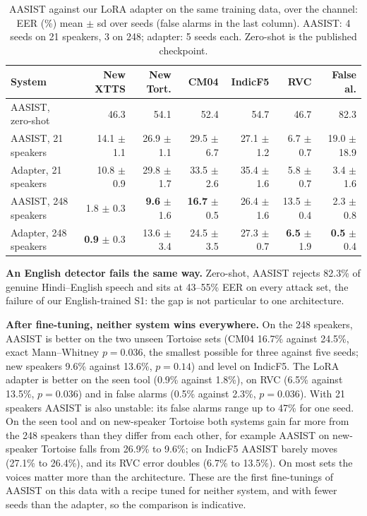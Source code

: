 \begin{table}[t]
\centering
\caption{AASIST against our LoRA adapter on the same training data, over the channel:
EER (\%) mean $\pm$ sd over seeds (false alarms in the last column). AASIST: 4 seeds on 21
speakers, 3 on 248; adapter: 5 seeds each. Zero-shot is the published checkpoint.}
\label{tab:aasist}
\footnotesize
\setlength{\tabcolsep}{3pt}
\begin{tabular}{@{}lrrrrrr@{}}
\toprule
System & New XTTS & New Tort. & CM04 & IndicF5 & RVC & False al. \\
\midrule
AASIST, zero-shot     & 46.3 & 54.1 & 52.4 & 54.7 & 46.7 & 82.3 \\
\midrule
AASIST, 21 speakers   & 14.1 $\pm$ 1.1 & 26.9 $\pm$ 1.1 & 29.5 $\pm$ 6.7 & 27.1 $\pm$ 1.2 & 6.7 $\pm$ 0.7 & 19.0 $\pm$ 18.9 \\
Adapter, 21 speakers  & 10.8 $\pm$ 0.9 & 29.8 $\pm$ 1.7 & 33.5 $\pm$ 2.6 & 35.4 $\pm$ 1.6 & 5.8 $\pm$ 0.7 & 3.4 $\pm$ 1.6 \\
\midrule
AASIST, 248 speakers  & 1.8 $\pm$ 0.3 & \textbf{9.6} $\pm$ 1.6 & \textbf{16.7} $\pm$ 0.5 & 26.4 $\pm$ 1.6 & 13.5 $\pm$ 0.4 & 2.3 $\pm$ 0.8 \\
Adapter, 248 speakers & \textbf{0.9} $\pm$ 0.3 & 13.6 $\pm$ 3.4 & 24.5 $\pm$ 3.5 & 27.3 $\pm$ 0.7 & \textbf{6.5} $\pm$ 1.9 & \textbf{0.5} $\pm$ 0.4 \\
\bottomrule
\end{tabular}
\end{table}

\textbf{An English detector fails the same way.} Zero-shot, AASIST rejects 82.3\% of
genuine Hindi--English speech and sits at 43--55\% EER on every attack set, the failure
of our English-trained S1: the gap is not particular to one architecture.

\textbf{After fine-tuning, neither system wins everywhere.} On the 248 speakers, AASIST
is better on the two unseen Tortoise sets (CM04 16.7\% against 24.5\%, exact
Mann--Whitney $p = 0.036$, the smallest possible for three against five seeds; new
speakers 9.6\% against 13.6\%, $p = 0.14$) and level on IndicF5. The LoRA adapter is better on the
seen tool (0.9\% against 1.8\%), on RVC (6.5\% against 13.5\%, $p = 0.036$) and in false
alarms (0.5\% against 2.3\%, $p = 0.036$). With 21 speakers AASIST is also unstable: its
false alarms range up to 47\% for one seed. On the seen tool and on new-speaker
Tortoise both systems gain far more from the 248 speakers than they differ from each
other, for example AASIST on new-speaker Tortoise falls from 26.9\% to 9.6\%; on
IndicF5 AASIST barely moves (27.1\% to 26.4\%), and its RVC error doubles (6.7\% to
13.5\%). On most sets the voices matter more than the architecture.
These are the first fine-tunings of AASIST on this data with a recipe tuned for neither
system, and with fewer seeds than the adapter, so the comparison is indicative.

